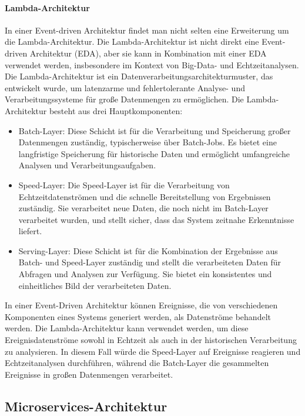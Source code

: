 \documentclass[../vs-script-first-v01.tex]{subfiles}
\begin{document}
\paragraph{Lambda-Architektur}
In einer Event-driven Architektur findet man nicht selten eine Erweiterung um die Lambda-Architektur.
Die Lambda-Architektur ist nicht direkt eine Event-driven Architektur (EDA), aber sie kann in Kombination mit einer EDA verwendet werden, insbesondere im Kontext von Big-Data- und Echtzeitanalysen. Die Lambda-Architektur ist ein Datenverarbeitungsarchitekturmuster, das entwickelt wurde, um latenzarme und fehlertolerante Analyse- und Verarbeitungssysteme für große Datenmengen zu ermöglichen. Die Lambda-Architektur besteht aus drei Hauptkomponenten:
\begin{itemize}
\item Batch-Layer: Diese Schicht ist für die Verarbeitung und Speicherung großer Datenmengen zuständig, typischerweise über Batch-Jobs. Es bietet eine langfristige Speicherung für historische Daten und ermöglicht umfangreiche Analysen und Verarbeitungsaufgaben.

\item Speed-Layer: Die Speed-Layer ist für die Verarbeitung von Echtzeitdatenströmen und die schnelle Bereitstellung von Ergebnissen zuständig. Sie verarbeitet neue Daten, die noch nicht im Batch-Layer verarbeitet wurden, und stellt sicher, dass das System zeitnahe Erkenntnisse liefert.

\item Serving-Layer: Diese Schicht ist für die Kombination der Ergebnisse aus Batch- und Speed-Layer zuständig und stellt die verarbeiteten Daten für Abfragen und Analysen zur Verfügung. Sie bietet ein konsistentes und einheitliches Bild der verarbeiteten Daten.
\end{itemize}
In einer Event-Driven Architektur können Ereignisse, die von verschiedenen Komponenten eines Systems generiert werden, als Datenströme behandelt werden. Die Lambda-Architektur kann verwendet werden, um diese Ereignisdatenströme sowohl in Echtzeit als auch in der historischen Verarbeitung zu analysieren. In diesem Fall würde die Speed-Layer auf Ereignisse reagieren und Echtzeitanalysen durchführen, während die Batch-Layer die gesammelten Ereignisse in großen Datenmengen verarbeitet.

\subsection{Microservices-Architektur}
\end{document}
